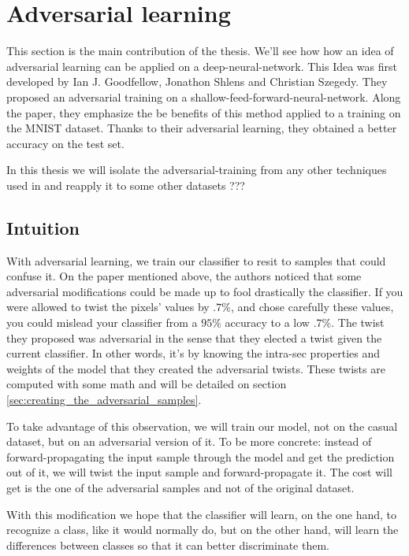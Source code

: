 


\section{Adversarial learning}
\label{sec:adversarial_learning}

	This section is the main contribution of the thesis. We'll see how how an idea of adversarial learning can be applied on a deep-neural-network. This Idea was first developed by Ian J. Goodfellow, Jonathon Shlens and Christian Szegedy. They proposed an adversarial training on a shallow-feed-forward-neural-network. Along the paper\cite{goodfellow2014explaining}, they emphasize the be benefits of this method applied to a training on the MNIST dataset\cite{lecun-mnist}. Thanks to their adversarial learning, they obtained a better accuracy on the test set.

	In this thesis we will isolate the adversarial-training from any other techniques used in \cite{goodfellow2014explaining} and reapply it to some other datasets ???
	
	
	\subsection{Intuition}
	\label{sub:intuition}
		With adversarial learning, we train our classifier to resit to samples that could confuse it. On the paper mentioned above\cite{goodfellow2014explaining}, the authors noticed that some adversarial modifications could be made up to fool drastically the classifier. If you were allowed to twist the pixels' values by $.7\%$, and chose carefully these values, you could mislead your classifier from a $95\%$ accuracy to a low $.7\%$. The twist they proposed was adversarial in the sense that they elected a twist given the current classifier. In other words, it's by knowing the intra-sec properties and weights of the model that they created the adversarial twists. These twists are computed with some math and will be detailed on section \ref{sec:creating_the_adversarial_samples}.

		To take advantage of this observation, we will train our model, not on the casual dataset, but on an adversarial version of it. To be more concrete: instead of forward-propagating the input sample through the model and get the prediction out of it, we will twist the input sample and forward-propagate it. The cost will get is the one of the adversarial samples and not of the original dataset.

		With this modification we hope that the classifier will learn, on the one hand, to recognize a class, like it would normally do, but on the other hand, will learn the differences between classes so that it can better discriminate them. 

